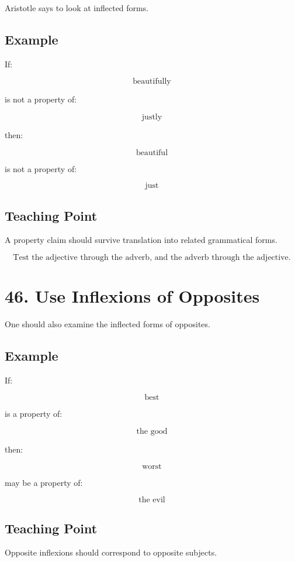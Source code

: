 \documentclass[12pt]{article}
\begin{document}
Aristotle says to look at inflected forms.

\subsection*{Example}

If:

\[
\text{beautifully}
\]

is not a property of:

\[
\text{justly}
\]

then:

\[
\text{beautiful}
\]

is not a property of:

\[
\text{just}
\]

\subsection*{Teaching Point}

A property claim should survive translation into related grammatical forms.

\[
\boxed{
\text{Test the adjective through the adverb, and the adverb through the adjective.}
}
\]

\section*{46. Use Inflexions of Opposites}

One should also examine the inflected forms of opposites.

\subsection*{Example}

If:

\[
\text{best}
\]

is a property of:

\[
\text{the good}
\]

then:

\[
\text{worst}
\]

may be a property of:

\[
\text{the evil}
\]

\subsection*{Teaching Point}

Opposite inflexions should correspond to opposite subjects.
\end{document}

